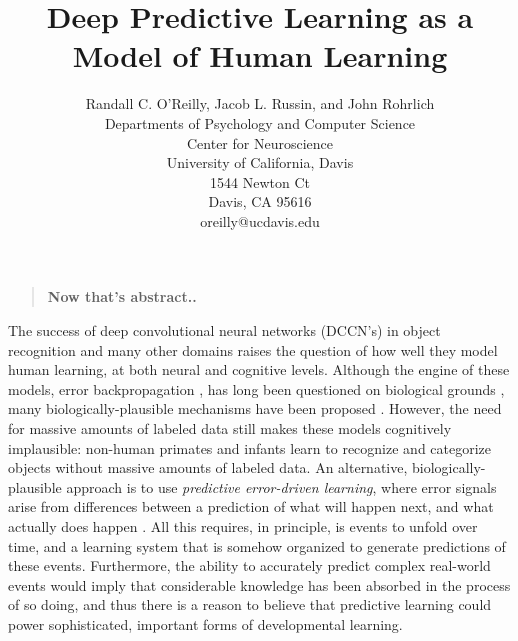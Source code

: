 \documentclass[11pt,twoside]{article}
\title{ Deep Predictive Learning as a Model of Human Learning }
\author{Randall C. O'Reilly, Jacob L. Russin, and John Rohrlich\\
  Departments of Psychology and Computer Science\\
  Center for Neuroscience\\
  University of California, Davis \\
  1544 Newton Ct\\
  Davis, CA 95616\\
  {\small oreilly@ucdavis.edu}\\}
\newif\myifpdf
\newenvironment{sciabstract}{%
\begin{quote} \bf}
{\end{quote}}
\begin{document}
\sloppy
\raggedbottom
\baselineskip20pt

\maketitle 

\clearpage

\begin{sciabstract}
  Now that's abstract..
\end{sciabstract}

\clearpage

\pagestyle{myheadings}

The success of deep convolutional neural networks (DCCN's) \cite{KrizhevskySutskeverHinton12,LeCunBengioHinton15,Schmidhuber15a} in object recognition and many other domains raises the question of how well they model human learning, at both neural and cognitive levels.  Although the engine of these models, error backpropagation \cite{RumelhartHintonWilliams86}, has long been questioned on biological grounds \cite{Crick89}, many biologically-plausible mechanisms have been proposed \cite{OReilly96,XieSeung03,BengioMesnardFischerEtAl17}.  However, the need for massive amounts of labeled data still makes these models cognitively implausible: non-human primates and infants learn to recognize and categorize objects without massive amounts of labeled data.  An alternative, biologically-plausible approach is to use {\em predictive error-driven learning}, where error signals arise from differences between a prediction of what will happen next, and what actually does happen \cite{Elman90,ElmanBatesKarmiloff-SmithEtAl96}.  All this requires, in principle, is events to unfold over time, and a learning system that is somehow organized to generate predictions of these events.  Furthermore, the ability to accurately predict complex real-world events would imply that considerable knowledge has been absorbed in the process of so doing, and thus there is a reason to believe that predictive learning could power sophisticated, important forms of developmental learning.
\end{document}
